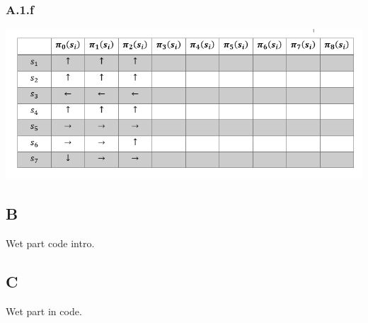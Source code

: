 \documentclass[12pt]{article}
\begin{document}
\subsubsection*{A.1.f}

\includegraphics[]{hw3/plots/A_6.PNG}

\subsection*{B}
Wet part code intro.

\subsection*{C}
Wet part in code.
\end{document}
